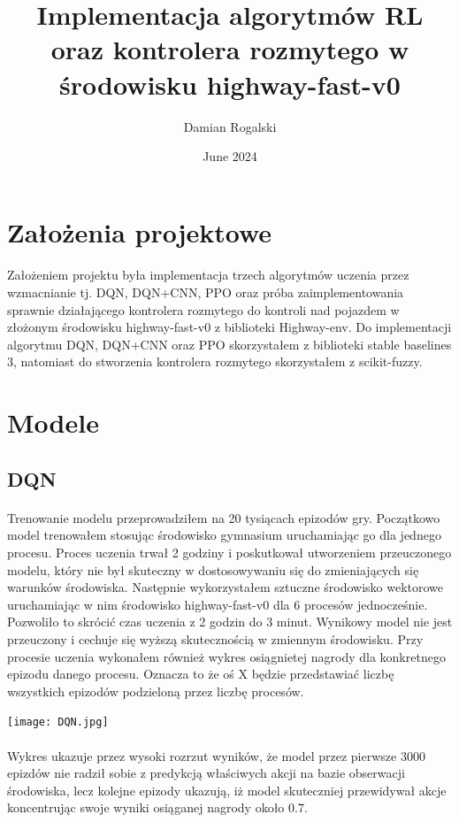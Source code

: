\documentclass{article}
\title{Implementacja algorytmów RL oraz kontrolera rozmytego w środowisku highway-fast-v0}
\author{Damian Rogalski}
\date{June 2024}
\begin{document}
\maketitle

\section{Założenia projektowe}
\paragraph{}
Założeniem projektu była implementacja trzech algorytmów uczenia przez wzmacnianie tj. DQN, DQN+CNN, PPO oraz próba zaimplementowania sprawnie działającego kontrolera rozmytego do kontroli nad pojazdem w złożonym środowisku highway-fast-v0 z biblioteki Highway-env. Do implementacji algorytmu DQN, DQN+CNN oraz PPO skorzystałem z biblioteki stable baselines 3, natomiast do stworzenia kontrolera rozmytego skorzystałem z scikit-fuzzy.

\section{Modele}
\subsection{DQN}
\paragraph{}
 Trenowanie modelu przeprowadziłem na 20 tysiącach epizodów gry. Początkowo model trenowałem stosując środowisko gymnasium uruchamiając go dla jednego procesu. Proces uczenia trwał 2 godziny i poskutkował utworzeniem przeuczonego modelu, który nie był skuteczny w dostosowywaniu się do zmieniających się warunków środowiska. Następnie wykorzystałem sztuczne środowisko wektorowe uruchamiając w nim środowisko highway-fast-v0 dla 6 procesów jednocześnie. Pozwoliło to skrócić czas uczenia z 2 godzin do 3 minut. Wynikowy model nie jest przeuczony i cechuje się wyższą skutecznością w zmiennym środowisku. Przy procesie uczenia wykonałem również wykres osiągnietej nagrody dla konkretnego epizodu danego procesu. Oznacza to że oś X będzie przedstawiać liczbę wszystkich epizodów podzieloną przez liczbę procesów.

\newpage

\texttt{[image: DQN.jpg]}
\paragraph{}
Wykres ukazuje przez wysoki rozrzut wyników, że model przez pierwsze 3000 epizdów nie radził sobie z predykcją właściwych akcji na bazie obserwacji środowiska, lecz kolejne epizody ukazują, iż model skuteczniej przewidywał akcje koncentrując swoje wyniki osiąganej nagrody około 0.7.
\end{document}
